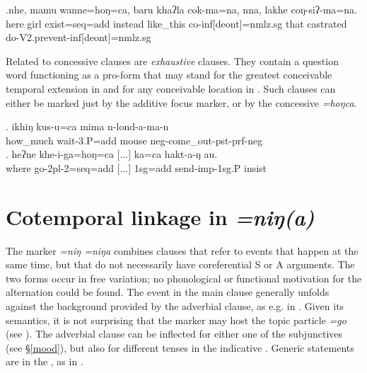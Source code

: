  \exg.nhe, mamu wanne=hoŋ=ca,                baru   khaʔla   cok-ma=na,                  nna, lakhe     coŋ-siʔ-ma=na.\\
 here girl exist{\sc [3;npst]=seq=add} instead like\_this co{\sc -inf[deont]=nmlz.sg} that castrated do{\sc -V2.prevent-inf[deont]=nmlz.sg}\\
  
 
 Related to concessive clauses are \emph{exhaustive} clauses. They contain a question word functioning as a pro-form that may stand for the greatest conceivable temporal extension in \Next[a] and for any conceivable location in \Next[b]. Such clauses can either be marked just by the additive focus marker, or by the concessive \emph{=hoŋca}.
 
 \exg. ikhiŋ   kus-u=ca                        mima  n-lond-a-ma-n\\
 how\_much wait{\sc -3.P=add} mouse {\sc neg-}come\_out{\sc -pst-prf-neg}\\
  
\bg. heʔne khe-i-ga=hoŋ=ca      [...]         ka=ca         hakt-a-ŋ          au. \\
where go{\sc -2pl-2=seq=add} [...] {\sc 1sg=add} send{\sc -imp-1sg.P} {\sc insist}\\
 


\section{Cotemporal linkage in \emph{=niŋ(a)}}\label{sim-finite}

The marker  \emph{=niŋ \ti =niŋa} combines clauses that refer to  events that happen at the same time, but that do not necessarily have coreferential S or A arguments. The two forms occur in free variation; no phonological or functional motivation for the alternation could be found. The event in the main clause generally unfolds against the background provided by the adverbial clause, as e.g. in \Next. Given its semantics, it is not surprising that the marker may  host the  topic particle \emph{=go} (see \Next[b]). The adverbial clause can be inflected for either one of the subjunctives (see §\ref{mood}), but also for different  tenses in the indicative . Generic statements are in the , as in  \Next[a].

